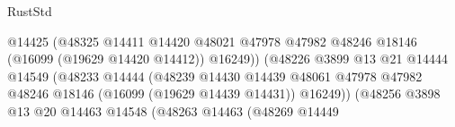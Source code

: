 \begin{lexlean}{RustStd}
\begin{coremodule}
                                                          @14425
                                                          (@48325
                                                            @14411
                                                            @14420
                                                            @48021
                                                            @47978
                                                            @47982
                                                            @48246
                                                            @18146
                                                            (@16099 (@19629 @14420 @14412))
                                                            @16249))
                                                        (@48226
                                                          @3899
                                                          @13
                                                          @21
                                                          @14444
                                                          @14549
                                                          (@48233
                                                            @14444
                                                            (@48239
                                                              @14430
                                                              @14439
                                                              @48061
                                                              @47978
                                                              @47982
                                                              @48246
                                                              @18146
                                                              (@16099 (@19629 @14439 @14431))
                                                              @16249))
                                                          (@48256
                                                            @3898
                                                            @13
                                                            @20
                                                            @14463
                                                            @14548
                                                            (@48263
                                                              @14463
                                                              (@48269
                                                                @14449

\end{coremodule}
\end{lexlean}
